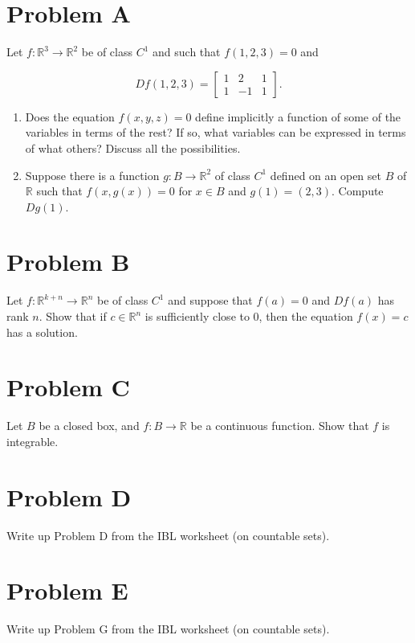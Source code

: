 \documentclass[lang=en,11pt]{template}
\begin{document}
\section*{Problem A}
Let \( f : \mathbb{R}^3 \to \mathbb{R}^2 \) be of class \( C^1 \) and such that \( f(1, 2, 3) = 0 \) and

\[
Df(1, 2, 3) =
\begin{bmatrix}
1 & 2 & 1 \\
1 & -1 & 1
\end{bmatrix}
.
\]

\begin{enumerate}
    \item Does the equation \( f(x, y, z) = 0 \) define implicitly a function of some of the variables in terms of the rest? If so, what variables can be expressed in terms of what others? Discuss all the possibilities.
    \item Suppose there is a function \( g : B \to \mathbb{R}^2 \) of class \( C^1 \) defined on an open set \( B \) of \( \mathbb{R} \) such that \( f(x, g(x)) = 0 \) for \( x \in B \) and \( g(1) = (2, 3) \). Compute \( Dg(1) \).
\end{enumerate}

\section*{Problem B}
Let \( f : \mathbb{R}^{k+n} \to \mathbb{R}^n \) be of class \( C^1 \) and suppose that \( f(a) = 0 \) and \( Df(a) \) has rank \( n \). Show that if \( c \in \mathbb{R}^n \) is sufficiently close to 0, then the equation \( f(x) = c \) has a solution.

\section*{Problem C}
Let \( B \) be a closed box, and \( f : B \to \mathbb{R} \) be a continuous function. Show that \( f \) is integrable.

\section*{Problem D}
Write up Problem D from the IBL worksheet (on countable sets).

\section*{Problem E}
Write up Problem G from the IBL worksheet (on countable sets).
\end{document}
